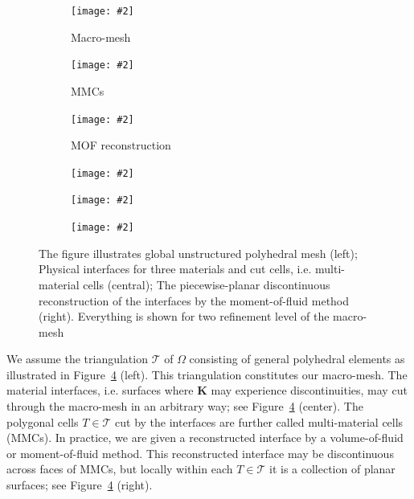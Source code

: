 \documentclass[12pt]{article}
\newcommand{\includegraphicsw}[2][1.]{\texttt{[image: \#2]}}
\newcommand{\vect}[1]{\boldsymbol{\mathbf{#1}}}
\newcommand{\bcell}{T}
\newcommand{\bmesh}{{\vect{\mathcal T}}}
\begin{document}
	\begin{figure}[h]
		\centering
		\begin{subfigure}{.33\linewidth}
			\centering
			\includegraphicsw{ring_base_voronoi.png}
			\caption{Macro-mesh}
			\label{fig:problem_geometry:base_mesh}
		\end{subfigure}%
		\hfill
		\begin{subfigure}{.33\linewidth}
			\centering
			\includegraphicsw{ring_mmcs_voronoi.png}
			\caption{MMCs}
			\label{fig:problem_geometry:mmcs}
		\end{subfigure}%
		\hfill
		\begin{subfigure}{.33\linewidth}
			\centering
			\includegraphicsw{ring_mini_voronoi.png}
			\caption{MOF reconstruction}
			\label{fig:problem_geometry:mof}
		\end{subfigure}
		\begin{subfigure}{.33\linewidth}
			\centering
			\includegraphicsw{ring_base_voronoi_refined.png}
		\end{subfigure}%
		\hfill
		\begin{subfigure}{.33\linewidth}
			\centering
			\includegraphicsw{ring_mmcs_voronoi_refined.png}
		\end{subfigure}%
		\hfill
		\begin{subfigure}{.33\linewidth}
			\centering
			\includegraphicsw{ring_mini_voronoi_refined.png}
		\end{subfigure}
		\caption{The figure illustrates global unstructured polyhedral mesh (left); Physical interfaces for three materials and cut cells, i.e. multi-material cells (central); The piecewise-planar discontinuous reconstruction of the interfaces by the moment-of-fluid method (right). Everything is shown for two refinement level of the macro-mesh \label{fig:problem_geometry}}
	\end{figure}
	
	We assume the triangulation  $\bmesh$ of $\Omega$ consisting of general polyhedral elements as illustrated in Figure~\ref{fig:problem_geometry} (left). This triangulation constitutes our macro-mesh. The material interfaces, i.e. surfaces where $\vect K$ may experience discontinuities, may cut through the macro-mesh in an arbitrary way; see Figure~\ref{fig:problem_geometry} (center). The polygonal cells ${\bcell \in \bmesh}$ cut by the interfaces are further called multi-material cells (MMCs). In practice,  we are given a reconstructed interface by a volume-of-fluid or moment-of-fluid method. This reconstructed interface may be discontinuous across faces of MMCs, but locally within each ${\bcell \in \bmesh}$ it is a collection of planar surfaces; see Figure~\ref{fig:problem_geometry} (right).
	
\end{document}
